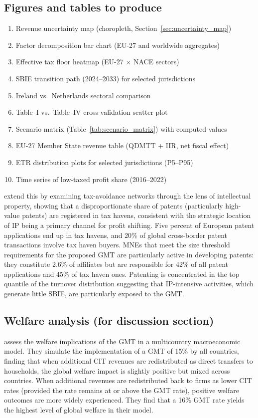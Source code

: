 \documentclass[11pt,a4paper]{article}
\begin{document}
\subsection{Figures and tables to produce}

\begin{enumerate}
\item Revenue uncertainty map (choropleth, Section~\ref{sec:uncertainty_map})
\item Factor decomposition bar chart (EU-27 and worldwide aggregates)
\item Effective tax floor heatmap (EU-27 $\times$ NACE sectors)
\item SBIE transition path (2024--2033) for selected jurisdictions
\item Ireland vs.\ Netherlands sectoral comparison
\item Table~I vs.\ Table~IV cross-validation scatter plot
\item Scenario matrix (Table~\ref{tab:scenario_matrix}) with computed values
\item EU-27 Member State revenue table (QDMTT + IIR, net fiscal effect)
\item ETR distribution plots for selected jurisdictions (P5--P95)
\item Time series of low-taxed profit share (2016--2022)
\end{enumerate}

\citet{bilicka2023} extend this by examining tax-avoidance networks through the lens of intellectual property, showing that a disproportionate share of patents (particularly high-value patents) are registered in tax havens, consistent with the strategic location of IP being a primary channel for profit shifting. Five percent of European patent applications end up in tax havens, and 20\% of global cross-border patent transactions involve tax haven buyers. MNEs that meet the size threshold requirements for the proposed GMT are particularly active in developing patents: they constitute 2.6\% of affiliates but are responsible for 42\% of all patent applications and 45\% of tax haven ones. Patenting is concentrated in the top quantile of the turnover distribution suggesting that IP-intensive activities, which generate little SBIE, are particularly exposed to the GMT.

\subsection{Welfare analysis (for discussion section)}

\citet{vantriet2025} assess the welfare implications of the GMT in a multicountry macroeconomic model. They simulate the implementation of a GMT of 15\% by all countries, finding that when additional CIT revenues are redistributed as direct transfers to households, the global welfare impact is slightly positive but mixed across countries. When additional revenues are redistributed back to firms as lower CIT rates (provided the rate remains at or above the GMT rate), positive welfare outcomes are more widely experienced. They find that a 16\% GMT rate yields the highest level of global welfare in their model.

\fi  %
\end{document}
